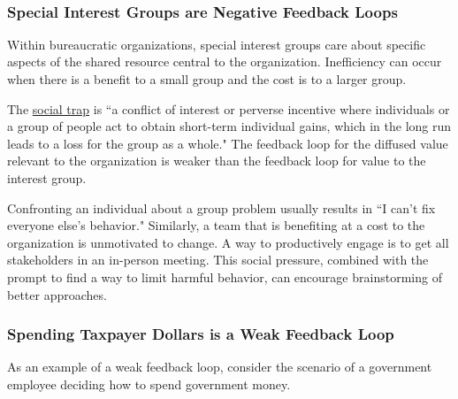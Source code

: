 
\ \\



\subsubsection*{Special Interest Groups are Negative Feedback Loops}

Within bureaucratic organizations, special interest groups care about specific aspects of the shared resource central to the organization. 
Inefficiency can occur when there is a benefit to a small group and the cost is to a larger group.

The \href{https://en.wikipedia.org/wiki/Social_trap}{social trap}
\iftoggle{WPinmargin}{\marginpar{$>$Wikipedia: social trap}}{}
is ``a conflict of interest or perverse incentive where individuals or a group of people act to obtain short-term individual gains, which in the long run leads to a loss for the group as a whole."
The feedback loop for the diffused value relevant to the organization is weaker than the feedback loop for value to the interest group. 

Confronting an individual about a group problem usually results in ``I can't fix everyone else's behavior." Similarly, a team that is benefiting at a cost to the organization is unmotivated to change. A way to productively engage is to get all stakeholders in an in-person meeting. This social pressure, combined with the prompt to find a way to limit harmful behavior, can encourage brainstorming of better approaches. 

\subsubsection*{Spending Taxpayer Dollars is a Weak Feedback Loop}

As an example of a weak feedback loop, consider the scenario of a government employee deciding how to spend government money.

